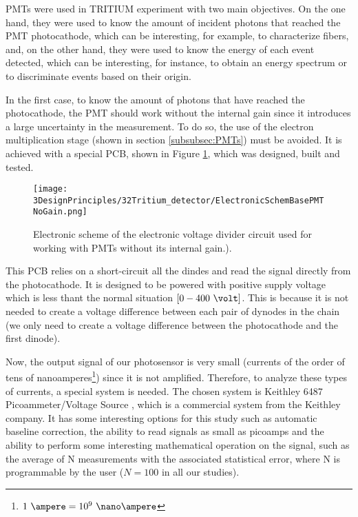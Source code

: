 PMTs were used in TRITIUM experiment with two main objectives. On the one hand, they were used to know the amount of incident photons that reached the PMT photocathode, which can be interesting, for example, to characterize fibers, and, on the other hand, they were used to know the energy of each event detected, which can be interesting, for instance, to obtain an energy spectrum or to discriminate events based on their origin. %

In the first case, to know the amount of photons that have reached the photocathode, the PMT should work without the internal gain since it introduces a large uncertainty in the measurement. To do so, the use of the electron multiplication stage (shown in section \ref{subsubsec:PMTs}) must be avoided. It is achieved with a special PCB, shown in Figure \ref{fig:ElectronicSchemeBasePMTNoGain}, which was designed, built and tested.  


\begin{figure}[htbp]
\centering
\texttt{[image: 3DesignPrinciples/32Tritium\_detector/ElectronicSchemBasePMTNoGain.png]}
\caption{Electronic scheme of the electronic voltage divider circuit used for working with PMTs without its internal gain.).\label{fig:ElectronicSchemeBasePMTNoGain}}
\end{figure}

This PCB relies on a short-circuit all the dindes and read the signal directly from the photocathode. It is designed to be powered with positive supply voltage which is less thant the normal situation $[0-400~\volt]$. This is because it is not needed to create a voltage difference between each pair of dynodes in the chain (we only need to create a voltage difference between the photocathode and the first dinode).

Now, the output signal of our photosensor is very small (currents of the order of tens of nanoamperes\footnote{$1~\ampere=10^{9}~\nano\ampere$}) since it is not amplified. Therefore, to analyze these types of currents, a special system is needed. The chosen system is Keithley 6487 Picoammeter/Voltage Source \cite{DataSheetKeithley6487}, which is a commercial system from the Keithley company. It has some interesting options for this study such as automatic baseline correction, the ability to read signals as small as picoamps and the ability to perform some interesting mathematical operation on the signal, such as the average of N measurements with the associated statistical error, where N is programmable by the user ($N=100$ in all our studies).

